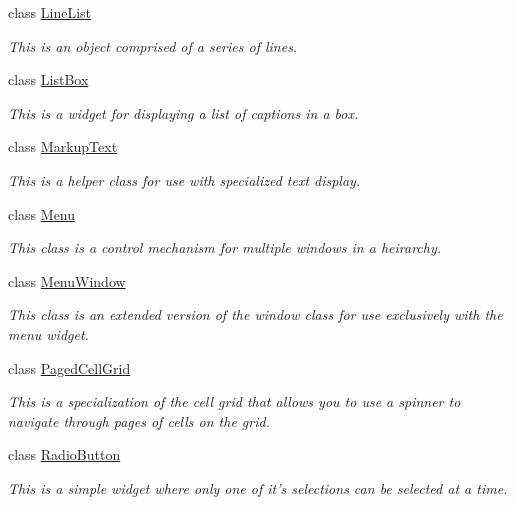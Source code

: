 \begin{DoxyCompactItemize}
class \hyperlink{classMezzanine_1_1UI_1_1LineList}{LineList}
\begin{DoxyCompactList}\small\item\em This is an object comprised of a series of lines. \item\end{DoxyCompactList}\item 
class \hyperlink{classMezzanine_1_1UI_1_1ListBox}{ListBox}
\begin{DoxyCompactList}\small\item\em This is a widget for displaying a list of captions in a box. \item\end{DoxyCompactList}\item 
class \hyperlink{classMezzanine_1_1UI_1_1MarkupText}{MarkupText}
\begin{DoxyCompactList}\small\item\em This is a helper class for use with specialized text display. \item\end{DoxyCompactList}\item 
class \hyperlink{classMezzanine_1_1UI_1_1Menu}{Menu}
\begin{DoxyCompactList}\small\item\em This class is a control mechanism for multiple windows in a heirarchy. \item\end{DoxyCompactList}\item 
class \hyperlink{classMezzanine_1_1UI_1_1MenuWindow}{MenuWindow}
\begin{DoxyCompactList}\small\item\em This class is an extended version of the window class for use exclusively with the menu widget. \item\end{DoxyCompactList}\item 
class \hyperlink{classMezzanine_1_1UI_1_1PagedCellGrid}{PagedCellGrid}
\begin{DoxyCompactList}\small\item\em This is a specialization of the cell grid that allows you to use a spinner to navigate through pages of cells on the grid. \item\end{DoxyCompactList}\item 
class \hyperlink{classMezzanine_1_1UI_1_1RadioButton}{RadioButton}
\begin{DoxyCompactList}\small\item\em This is a simple widget where only one of it's selections can be selected at a time. \item\end{DoxyCompactList}\item 

\end{DoxyCompactItemize}
